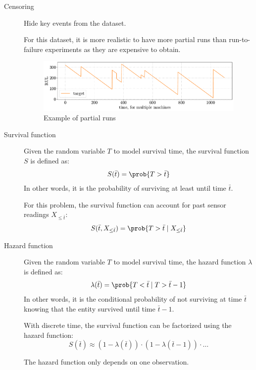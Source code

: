 \begin{description}
    \item[Censoring] 
        Hide key events from the dataset.

        \begin{remark}
            For this dataset, it is more realistic to have more partial runs than run-to-failure experiments as they are expensive to obtain.
            \begin{figure}[H]
                \centering
                \includegraphics[width=0.7\linewidth]{./img/_rul_censoring.pdf}
                \caption{Example of partial runs}
            \end{figure}
        \end{remark}

    \item[Survival function] 
        Given the random variable $T$ to model survival time, the survival function $S$ is defined as:
        \[ S(\bar{t}) = \prob{T > \bar{t}} \]
        In other words, it is the probability of surviving at least until time $\bar{t}$.

        For this problem, the survival function can account for past sensor readings $X_{\leq \bar{t}}$:
        \[ S(\bar{t}, X_{\leq \bar{t}}) = \prob{T > \bar{t} \mid X_{\leq \bar{t}}} \]

    \item[Hazard function] 
        Given the random variable $T$ to model survival time, the hazard function $\lambda$ is defined as:
        \[ \lambda(\bar{t}) = \prob{T < \bar{t} \mid T > \bar{t}-1} \]
        In other words, it is the conditional probability of not surviving at time $\bar{t}$ knowing that the entity survived until time $\bar{t}-1$.

        With discrete time, the survival function can be factorized using the hazard function:
        \[ S(\bar{t}) \approx (1-\lambda(\bar{t})) \cdot (1 - \lambda(\bar{t}-1)) \cdot \dots \]

        \begin{remark}
            The hazard function only depends on one observation.
        \end{remark}


\end{description}
